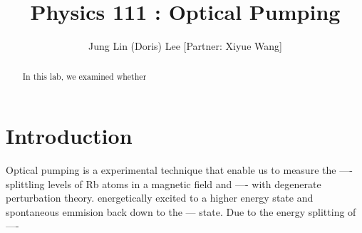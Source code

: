 \documentclass{sigchi}
\def\plaintitle{Physics 111 : Optical Pumping}
\begin{document}
\title{\plaintitle}
\author{Jung Lin (Doris) Lee  [Partner: Xiyue Wang] }
\maketitle

\begin{abstract}
In this lab, we examined whether 
\end{abstract}

\section{Introduction}\label{sec:intro}
\par %
Optical pumping is a experimental technique that enable us to measure the ---- splittling levels of Rb atoms in a magnetic field and ---- with degenerate perturbation theory. 
energetically excited to a higher energy state and spontaneous emmision back down to the --- state. Due to the energy splitting of ---- 
\end{document}
